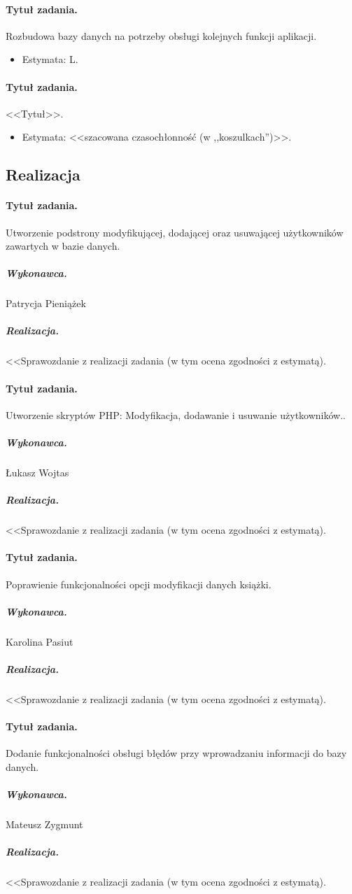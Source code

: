 \documentclass[a4paper]{article}
\begin{document}
\paragraph{Tytuł zadania.} Rozbudowa bazy danych na potrzeby obsługi kolejnych funkcji aplikacji.
\begin{itemize}
\item Estymata: L.
\end{itemize}

\paragraph{Tytuł zadania.} <<Tytuł>>.
\begin{itemize}
\item Estymata: <<szacowana czasochłonność (w ,,koszulkach'')>>.
\end{itemize}
\subsection{Realizacja}


\paragraph{Tytuł zadania.}  Utworzenie podstrony modyfikującej, dodającej oraz usuwającej użytkowników zawartych w bazie danych.
\subparagraph{Wykonawca.} Patrycja Pieniążek 
\subparagraph{Realizacja.} <<Sprawozdanie z realizacji zadania (w tym ocena zgodności z estymatą).



\paragraph{Tytuł zadania.}  Utworzenie skryptów PHP: Modyfikacja, dodawanie i usuwanie użytkowników..
\subparagraph{Wykonawca.} Łukasz Wojtas
\subparagraph{Realizacja.} <<Sprawozdanie z realizacji zadania (w tym ocena zgodności z estymatą).



\paragraph{Tytuł zadania.} Poprawienie funkcjonalności opcji modyfikacji danych książki.
\subparagraph{Wykonawca.} Karolina Pasiut
\subparagraph{Realizacja.} <<Sprawozdanie z realizacji zadania (w tym ocena zgodności z estymatą).



\paragraph{Tytuł zadania.} Dodanie funkcjonalności obsługi błędów przy wprowadzaniu informacji do bazy danych.
\subparagraph{Wykonawca.} Mateusz Zygmunt
\subparagraph{Realizacja.} <<Sprawozdanie z realizacji zadania (w tym ocena zgodności z estymatą).
\end{document}
